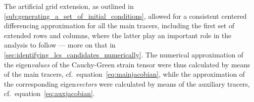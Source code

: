 \vfill{}

The artificial grid extension, as outlined in
\cref{sub:generating_a_set_of_initial_conditions}, allowed for a consistent
centered differencing approximation for all the main tracers, including the
first set of extended rows and columns, where the latter play an important
role in the analysis to follow --- more on that in
\cref{sec:identifying_lcs_candidates_numerically}. The numerical approximation
of the eigen\emph{values} of the Cauchy-Green strain tensor were thus calculated
by means of the main tracers, cf.\ equation~\eqref{eq:mainjacobian}, while
the approximation of the corresponding eigen\emph{vectors} were calculated by
means of the auxiliary tracers, cf.\ equation~\eqref{eq:auxjacobian}.

